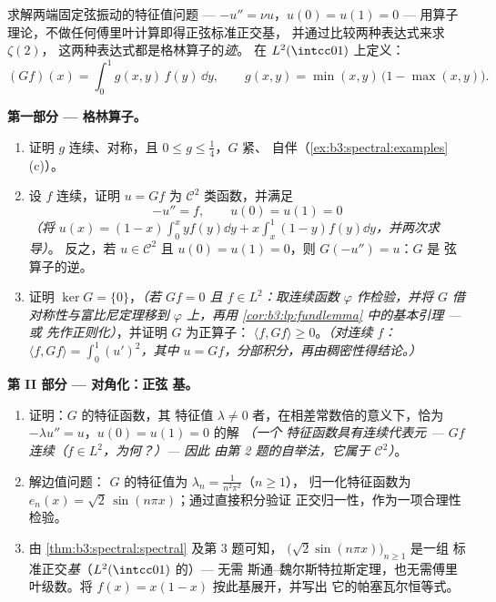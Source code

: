\begin{problem}\label{pb:b3:spectral:1}
求解两端固定弦振动的特征值问题 ---
$-u'' = \nu u$，$u(0) = u(1) = 0$ ---
用算子理论，不做任何傅里叶计算即得正弦标准正交基，
并通过比较两种表达式来求 $\zeta(2)$，
这两种表达式都是格林算子的\emph{迹}。
在 $L^2(\intcc01)$ 上定义：
\[
(Gf)(x) = \int_0^1 g(x,y)\,f(y)\,\dd y,
\qquad
g(x, y) = \min(x,y)\,\bigl(1 - \max(x,y)\bigr).
\]

\medskip
\noindent\textbf{第一部分 --- 格林算子。}
\begin{enumerate}
  \item 证明 $g$ 连续、对称，且 $0 \leq g
        \leq \frac14$，$G$ 紧、
        自伴（\cref{ex:b3:spectral:examples}(c)）。
  \item 设 $f$ 连续，证明 $u = Gf$ 为 $\mathcal
        C^2$ 类函数，并满足
        \[
        -u'' = f, \qquad u(0) = u(1) = 0
        \]
        \emph{（将 $u(x) = (1-x)\int_0^xyf(y)\dd y +
        x\int_x^1(1-y)f(y)\dd y$，并两次求导）}。
        反之，若 $u \in \mathcal C^2$ 且 $u(0) = u(1)
        = 0$，则 $G(-u'') = u$：$G$ 是
        弦算子的逆。
  \item 证明 $\ker G = \{0\}$，\emph{（若 $Gf = 0$ 且 $f \in
        L^2$：取连续函数 $\varphi$ 作检验，并将 $G$
        借对称性与富比尼定理移到 $\varphi$ 上，再用
        \cref{cor:b3:lp:fundlemma} 中的基本引理 --- 或
        先作正则化）}，并证明 $G$ 为正算子：
        $\langle f, Gf\rangle \geq 0$。\emph{（对连续
        $f$：$\langle f, Gf\rangle = \int_0^1 (u')^2$，其中 $u
        = Gf$，分部积分，再由稠密性得结论。）}
\end{enumerate}

\medskip
\noindent\textbf{第 II 部分 --- 对角化：正弦
基。}
\begin{enumerate}[resume]
  \item 证明：$G$ 的特征函数，其
        特征值 $\lambda \ne 0$ 者，在相差常数倍的意义下，恰为
        $-\lambda u'' = u$，$u(0) = u(1) = 0$ 的解 \emph{（一个
        特征函数具有连续代表元 --- $Gf$
        连续（$f \in L^2$，为何？）--- 因此
        由第 2 题的自举法，它属于 $\mathcal C^2$）}。
  \item 解边值问题：
        $G$ 的特征值为 $\lambda_n = \frac1{n^2\pi^2}$（$n \geq 1$），
        归一化特征函数为 $e_n(x) =
        \sqrt2\,\sin(n\pi x)$；通过直接积分验证
        正交归一性，作为一项合理性检验。
  \item 由
        \cref{thm:b3:spectral:spectral} 及第 3 题可知，
        $\bigl(\sqrt2\sin(n\pi x)\bigr)_{n\geq1}$ 是一组
        标准正交\emph{基}（$L^2(\intcc01)$ 的）--- 无需
        斯通–魏尔斯特拉斯定理，也无需傅里叶级数。将
        $f(x) = x(1-x)$ 按此基展开，并写出
        它的帕塞瓦尔恒等式。
\end{enumerate}


\end{problem}
